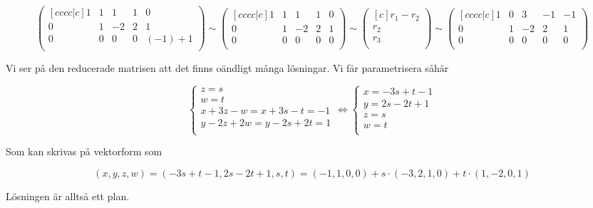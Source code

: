 \documentclass[../../main.tex]{subfiles}
\begin{document}
\begin{solution}{15}
$$
\begin{pmatrix}[cccc|c]
1 & 1 & 1 & 1 & 0\\
0 & 1 & -2 & 2 & 1\\
0 & 0 & 0 & 0 & (-1)+1\\
\end{pmatrix}
\sim
\begin{pmatrix}[cccc|c]
1 & 1 & 1 & 1 & 0\\
0 & 1 & -2 & 2 & 1\\
0 & 0 & 0 & 0 & 0\\
\end{pmatrix}
\sim 
\begin{pmatrix}[c]
r_1 - r_2\\
r_2\\
r_3\\
\end{pmatrix}
\sim 
\begin{pmatrix}[cccc|c]
1 & 0 & 3 & -1 & -1\\
0 & 1 & -2 & 2 & 1\\
0 & 0 & 0 & 0 & 0\\
\end{pmatrix}
$$

Vi ser på den reducerade matrisen att det finns oändligt många lösningar. Vi får parametrisera såhär

$$
\begin{cases}
z = s\\
w = t\\
x + 3z - w = x + 3s - t = -1\\
y -2z + 2w = y - 2s + 2t = 1\\
\end{cases}
\iff 
\begin{cases}
x =-3s + t -1\\
y = 2s - 2t + 1\\
z = s\\
w = t\\
\end{cases}
$$

Som kan skrivas på vektorform som 

$$
(x, y, z, w) = (-3s + t -1, 2s - 2t + 1, s, t) = (-1, 1, 0, 0) + s\cdot(-3, 2, 1, 0) + t\cdot(1, -2, 0, 1)
$$

Lösningen är alltså ett plan.

\end{solution}
\end{document}
